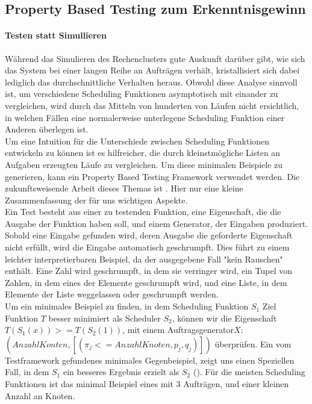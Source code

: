 \FloatBarrier
\subsection{Property Based Testing zum Erkenntnisgewinn}
\label{proptest}
\paragraph{Testen statt Simullieren}
Während das Simulieren des Rechenclusters gute Auskunft darüber gibt, wie sich das System bei einer langen Reihe an Aufträgen verhält, kristallisiert sich dabei lediglich das durchschnittliche Verhalten heraus. Obwohl diese Analyse sinnvoll ist, um verschiedene Scheduling Funktionen asymptotisch mit einander zu vergleichen, wird durch das Mitteln von hunderten von Läufen nicht ersichtlich, in welchen Fällen eine normalerweise unterlegene Scheduling Funktion einer Anderen überlegen ist.\\
Um eine Intuition für die Unterschiede zwischen Scheduling Funktionen entwickeln zu können ist es hilfreicher, die durch kleinstmögliche Listen an Aufgaben erzeugten Läufe zu vergleichen. Um diese minimalen Beispiele zu generieren, kann ein Property Based Testing Framework verwendet werden. Die zukunftsweisende Arbeit dieses Themas ist \cite{hughes2000quickcheck}. Hier nur eine kleine Zusammenfassung der für uns wichtigen Aspekte. \\
Ein Test besteht aus einer zu testenden Funktion, eine Eigenschaft, die die Ausgabe der Funktion haben soll, und einem Generator, der Eingaben produziert. Sobald eine Eingabe gefunden wird, deren Ausgabe die geforderte Eigenschaft nicht erfüllt, wird die Eingabe automatisch geschrumpft. Dies führt zu einem leichter interpretierbaren Beispiel, da der ausgegebene Fall "kein Rauschen" enthält.
Eine Zahl wird geschrumpft, in dem sie verringer wird, ein Tupel von Zahlen, in dem eines der Elemente geschrumpft wird, und eine Liste, in dem Elemente der Liste weggelassen oder geschrumpft werden.\\

Um ein minimales Beispiel zu finden, in dem Scheduling Funktion $S_1$ Ziel Funktion $T$ besser minimiert als Scheduler $S_2$, können wir die Eigenschaft $T(S_1(x)) >= T (S_2(1))$, mit einem Auftragsgenerator$X$: $(Anzahl Konten,[(\pi_j <= Anzahl Knoten,p_j,q_j)])$ überprüfen.
Ein vom Testframework gefundenes minimales Gegenbeispiel, zeigt uns einen Speziellen Fall, in dem $S_1$ ein besseres Ergebnis erzielt als $S_2$ (\cite{TestOpt}).
Für die meisten Scheduling Funktionen ist das minimal Beispiel eines mit 3 Aufträgen, und einer kleinen Anzahl an Knoten.


